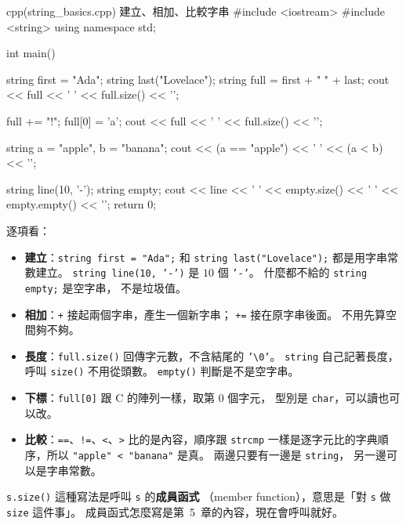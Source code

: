 \begin{example}[label=ex:string-basics]{cpp}{(string\_basics.cpp) 建立、相加、比較字串}
#include <iostream>
#include <string>
using namespace std;

int main() {
    string first = "Ada";
    string last("Lovelace");
    string full = first + " " + last;
    cout << full << ' ' << full.size() << '\n';

    full += "!";
    full[0] = 'a';
    cout << full << ' ' << full.size() << '\n';

    string a = "apple", b = "banana";
    cout << (a == "apple") << ' ' << (a < b) << '\n';

    string line(10, '-');
    string empty;
    cout << line << ' ' << empty.size() << ' ' << empty.empty() << '\n';
    return 0;
}
\end{example}


逐項看：

\begin{itemize}
\item \textbf{建立}：\texttt{string first = "Ada";} 和 \texttt{string
last("Lovelace");} 都是用字串常數建立。 \texttt{string line(10, '-')}
是 $10$ 個 \texttt{'-'}。 什麼都不給的 \texttt{string empty;} 是空字串，
不是垃圾值。
\item \textbf{相加}：\texttt{+} 接起兩個字串，產生一個新字串；
\texttt{+=} 接在原字串後面。 不用先算空間夠不夠。
\item \textbf{長度}：\texttt{full.size()} 回傳字元數，不含結尾的
\texttt{'\textbackslash 0'}。 \texttt{string} 自己記著長度，呼叫
\texttt{size()} 不用從頭數。 \texttt{empty()} 判斷是不是空字串。
\item \textbf{下標}：\texttt{full[0]} 跟 C 的陣列一樣，取第 $0$ 個字元，
型別是 \texttt{char}，可以讀也可以改。
\item \textbf{比較}：\texttt{==}、\texttt{!=}、\texttt{<}、\texttt{>}
比的是內容，順序跟 \texttt{strcmp} 一樣是逐字元比的字典順序，所以
\texttt{"apple" < "banana"} 是真。 兩邊只要有一邊是 \texttt{string}，
另一邊可以是字串常數。
\end{itemize}

\texttt{s.size()} 這種寫法是呼叫 \texttt{s} 的\textbf{成員函式}
（member function），意思是「對 \texttt{s} 做 \texttt{size} 這件事」。
成員函式怎麼寫是第~5~章的內容，現在會呼叫就好。

